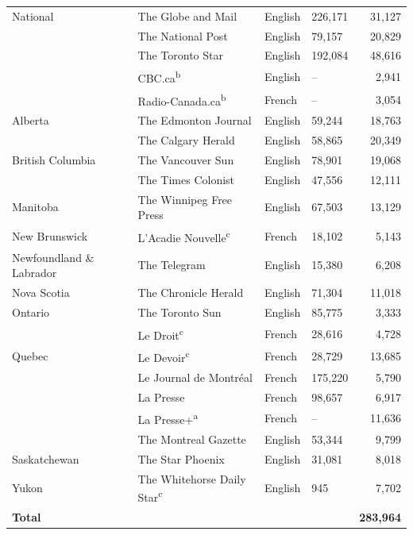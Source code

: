\documentclass[12pt]{article}
\renewcommand\_{\texttt{\detokenize{_}\allowbreak}}
\begin{document}
{\begin{longtable}{llllr}
National & The Globe and Mail & English & 226,171 & 31,127 \\
 & The National Post & English & 79,157 & 20,829 \\
 & The Toronto Star & English & 192,084 & 48,616 \\
 & CBC.ca\textsuperscript{b} & English & -- & 2,941 \\
 & Radio-Canada.ca\textsuperscript{b} & French & -- & 3,054 \\
\midrule
Alberta & The Edmonton Journal & English & 59,244 & 18,763 \\
 & The Calgary Herald & English & 58,865 & 20,349 \\
\midrule
British Columbia & The Vancouver Sun & English & 78,901 & 19,068 \\
 & The Times Colonist & English & 47,556 & 12,111 \\
\midrule
Manitoba & The Winnipeg Free Press & English & 67,503 & 13,129 \\
\midrule
New Brunswick & L'Acadie Nouvelle\textsuperscript{c} & French & 18,102 & 5,143 \\
\midrule
Newfoundland \& Labrador & The Telegram & English & 15,380 & 6,208 \\
\midrule
Nova Scotia & The Chronicle Herald & English & 71,304 & 11,018 \\
\midrule
Ontario & The Toronto Sun & English & 85,775 & 3,333 \\
 & Le Droit\textsuperscript{c} & French & 28,616 & 4,728 \\
\midrule
Quebec & Le Devoir\textsuperscript{c} & French & 28,729 & 13,685 \\
 & Le Journal de Montréal & French & 175,220 & 5,790 \\
 & La Presse & French & 98,657 & 6,917 \\
 & La Presse+\textsuperscript{a} & French & -- & 11,636 \\
 & The Montreal Gazette & English & 53,344 & 9,799 \\
\midrule
Saskatchewan & The Star Phoenix & English & 31,081 & 8,018 \\
\midrule
Yukon & The Whitehorse Daily Star\textsuperscript{c} & English & 945 & 7,702 \\
\midrule
\textbf{Total} & & & & \textbf{283,964} \\
\end{longtable}
}
\end{document}

